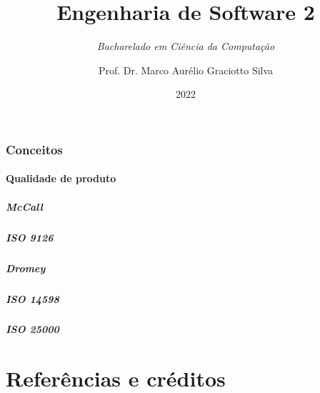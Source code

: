 \documentclass[utf8, english, brazil, usepdftitle=false, svgnames, color={table, fixpdftex, hyperref, fixinclude, xcdraw}, t]{beamer}
\title[]{\large Engenharia de Software 2}
\subtitle{\textit{Bacharelado em Ciência da Computação}}
\author[UTFPR]{Prof. Dr. Marco Aurélio Graciotto Silva}
\date[]{2022}
\begin{document}
\frontmatter{}


\mainmatter{}

% 
% 

\section{Conceitos}

% 

\subsection{Qualidade de produto}


\subsubsection{McCall}


\subsubsection{ISO 9126}


\subsubsection{Dromey}


\subsubsection{ISO 14598}


\subsubsection{ISO 25000}



\backmatter{}
\part{Referências e créditos}

\end{document}
